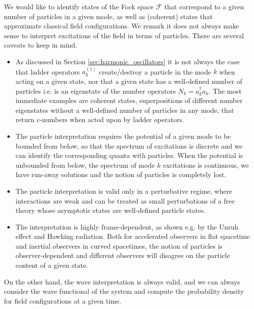 \documentclass[../QFT_main.tex]{subfiles}
\begin{document}
\begin{mytheorem}
%
We would like to identify states of the Fock space $\mathcal{F}$ that correspond to a given number of particles in a given mode, as well as (coherent) states that approximate classical field configurations.
We remark it does not always make sense to interpret excitations of the field in terms of particles.
There are several caveats to keep in mind.
\begin{itemize}
    \item As discussed in Section \ref{sec:harmonic_oscillators} it is not always the case that ladder operators $a_k^{(\dagger)}$ create/destroy a particle in the mode $k$ when acting on a given state, nor that a given state has a well-defined number of particles i.e. is an eigenstate of the number operators $N_k = a_k^{\dagger} a_k$.
    The most immediate examples are coherent states, superpositions of different number eigenstates without a well-defined number of particles in any mode, that return c-numbers when acted upon by ladder operators.
    \item  The particle interpretation requires the potential of a given mode to be bounded from below, so that the spectrum of excitations is discrete and we can identify the corresponding quanta with particles.
    When the potential is unbounded from below, the spectrum of mode $k$ excitations is continuous, we have run-away solutions and the notion of particles is completely lost.
    \item The particle interpretation is valid only in a perturbative regime, where interactions are weak and can be treated as small perturbations of a free theory whose asymptotic states are well-defined particle states.
    \item The interpretation is highly frame-dependent, as shown e.g. by the Unruh effect and Hawking radiation.
    Both for accelerated observers in flat spacetime and inertial observers in curved spacetimes, the notion of particles is observer-dependent and different observers will disagree on the particle content of a given state.
\end{itemize}
On the other hand, the wave interpretation is always valid, and we can always consider the wave functional of the system and compute the probability density for field configurations at a given time.
\end{mytheorem}
\end{document}
